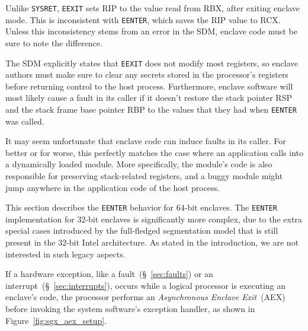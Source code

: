 Unlike \texttt{SYSRET}, \texttt{EEXIT} sets RIP to the value read from RBX,
after exiting enclave mode. This is inconsistent with \texttt{EENTER}, which
saves the RIP value to RCX. Unless this inconsistency stems from an error in
the SDM, enclave code must be sure to note the difference.

The SDM explicitly states that \texttt{EEXIT} does not modify most registers,
so enclave authors must make sure to clear any secrets stored in the
processor's registers before returning control to the host process.
Furthermore, enclave software will most likely cause a fault in its caller if
it doesn't restore the stack pointer RSP and the stack frame base pointer RBP
to the values that they had when \texttt{EENTER} was called.

It may seem unfortunate that enclave code can induce faults in its caller.
For better or for worse, this perfectly matches the case where an application
calls into a dynamically loaded module. More specifically, the module's code is
also responsible for preserving stack-related registers, and a buggy module
might jump anywhere in the application code of the host process.

This section describes the \texttt{EENTER} behavior for 64-bit enclaves. The
\texttt{EENTER} implementation for 32-bit enclaves is significantly more
complex, due to the extra special cases introduced by the full-fledged
segmentation model that is still present in the 32-bit Intel architecture. As
stated in the introduction, we are not interested in such legacy aspects.


\label{sec:sgx_aex}

If a hardware exception, like a fault~(\S~\ref{sec:faults}) or an
interrupt~(\S~\ref{sec:interrupts}), occurs while a logical processor is
executing an enclave's code, the processor performs an
\textit{Asynchronous Enclave Exit}~(AEX) before invoking the system software's
exception handler, as shown in Figure~\ref{fig:sgx_aex_setup}.


